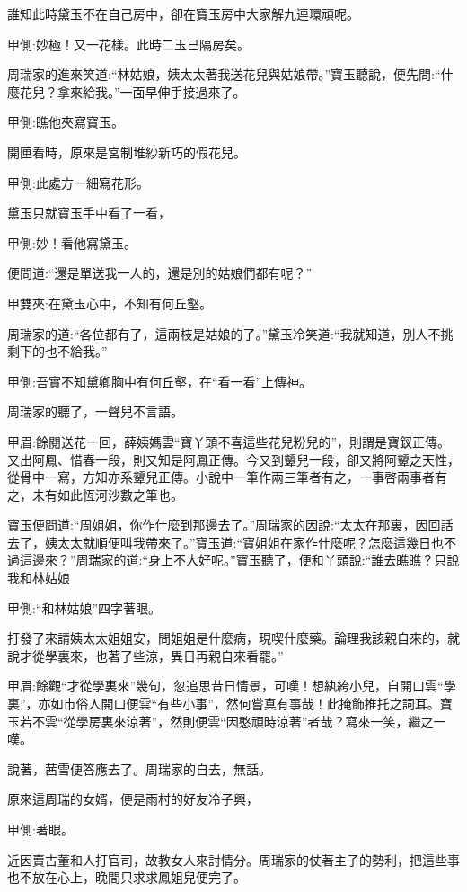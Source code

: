 \begin{parag}
    誰知此時黛玉不在自己房中，卻在寶玉房中大家解九連環頑呢。\begin{note}甲側:妙極！又一花樣。此時二玉已隔房矣。\end{note}周瑞家的進來笑道:“林姑娘，姨太太著我送花兒與姑娘帶。”寶玉聽說，便先問:“什麼花兒？拿來給我。”一面早伸手接過來了。\begin{note}甲側:瞧他夾寫寶玉。\end{note}開匣看時，原來是宮制堆紗新巧的假花兒。\begin{note}甲側:此處方一細寫花形。\end{note}黛玉只就寶玉手中看了一看，\begin{note}甲側:妙！看他寫黛玉。\end{note}便問道:“還是單送我一人的，還是別的姑娘們都有呢？”\begin{note}甲雙夾:在黛玉心中，不知有何丘壑。\end{note}周瑞家的道:“各位都有了，這兩枝是姑娘的了。”黛玉冷笑道:“我就知道，別人不挑剩下的也不給我。”\begin{note}甲側:吾實不知黛卿胸中有何丘壑，在“看一看”上傳神。\end{note}周瑞家的聽了，一聲兒不言語。\begin{note}甲眉:餘閱送花一回，薛姨媽雲“寶丫頭不喜這些花兒粉兒的”，則謂是寶釵正傳。又出阿鳳、惜春一段，則又知是阿鳳正傳。今又到顰兒一段，卻又將阿顰之天性，從骨中一寫，方知亦系顰兒正傳。小說中一筆作兩三筆者有之，一事啓兩事者有之，未有如此恆河沙數之筆也。\end{note}寶玉便問道:“周姐姐，你作什麼到那邊去了。”周瑞家的因說:“太太在那裏，因回話去了，姨太太就順便叫我帶來了。”寶玉道:“寶姐姐在家作什麼呢？怎麼這幾日也不過這邊來？”周瑞家的道:“身上不大好呢。”寶玉聽了，便和丫頭說:“誰去瞧瞧？只說我和林姑娘\begin{note}甲側:“和林姑娘”四字著眼。\end{note}打發了來請姨太太姐姐安，問姐姐是什麼病，現喫什麼藥。論理我該親自來的，就說才從學裏來，也著了些涼，異日再親自來看罷。”\begin{note}甲眉:餘觀“才從學裏來”幾句，忽追思昔日情景，可嘆！想紈絝小兒，自開口雲“學裏”，亦如市俗人開口便雲“有些小事”，然何嘗真有事哉！此掩飾推托之詞耳。寶玉若不雲“從學房裏來涼著”，然則便雲“因憨頑時涼著”者哉？寫來一笑，繼之一嘆。\end{note}說著，茜雪便答應去了。周瑞家的自去，無話。
\end{parag}


\begin{parag}
    原來這周瑞的女婿，便是雨村的好友冷子興，\begin{note}甲側:著眼。\end{note}近因賣古董和人打官司，故教女人來討情分。周瑞家的仗著主子的勢利，把這些事也不放在心上，晚間只求求鳳姐兒便完了。
\end{parag}


